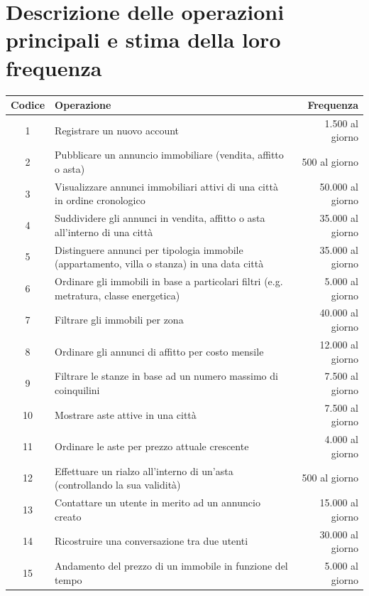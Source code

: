 \documentclass[a4paper,12pt]{report}
\begin{document}
    	\section{Descrizione delle operazioni principali e stima della loro frequenza}
        \begin{table}[H]
            \centering
            \begin{adjustbox}{width=1.45\textwidth,center}
            \begin{tabular}{clr}
            \rowcolor{LightCyan} \textbf{Codice} & \textbf{Operazione} & \textbf{Frequenza} \\ [0.5ex] 
            \hline
             1 & Registrare un nuovo account & 1.500 al giorno \\
             2 & Pubblicare un annuncio immobiliare (vendita, affitto o asta) & 500 al giorno \\
             3 & Visualizzare annunci immobiliari attivi di una città in ordine cronologico & 50.000 al giorno \\ 
             4 & Suddividere gli annunci in vendita, affitto o asta all'interno di una città & 35.000 al giorno \\
             5 & Distinguere annunci per tipologia immobile (appartamento, villa o stanza) in una data città & 35.000 al giorno \\
             6 & Ordinare gli immobili in base a particolari filtri (e.g. metratura, classe energetica) & 5.000 al giorno \\
             7 & Filtrare gli immobili per zona & 40.000 al giorno \\
             8 & Ordinare gli annunci di affitto per costo mensile & 12.000 al giorno \\
             9 & Filtrare le stanze in base ad un numero massimo di coinquilini & 7.500 al giorno \\
             10 & Mostrare aste attive in una città & 7.500 al giorno \\
             11 & Ordinare le aste per prezzo attuale crescente & 4.000 al giorno \\ 
             12 & Effettuare un rialzo all'interno di un'asta (controllando la sua validità) & 500 al giorno \\
             13 & Contattare un utente in merito ad un annuncio creato & 15.000 al giorno \\
             14 & Ricostruire una conversazione tra due utenti & 30.000 al giorno \\
             15 & Andamento del prezzo di un immobile in funzione del tempo & 5.000 al giorno \\

\end{tabular}
\end{adjustbox}
\end{table}
\end{document}
